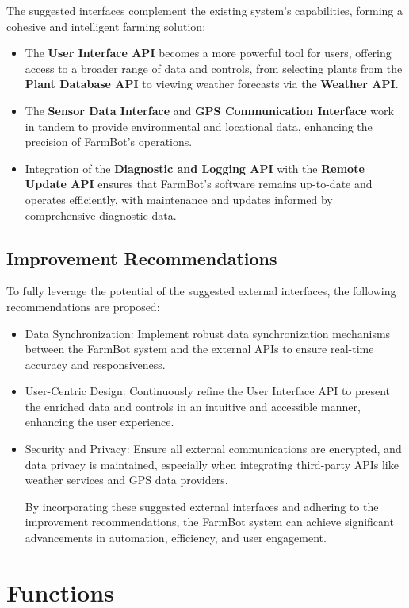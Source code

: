 The suggested interfaces complement the existing system's capabilities, forming a cohesive and intelligent farming solution:
\begin{itemize}
 

   \item  The \textbf{User Interface API} becomes a more powerful tool for users, offering access to a broader range of data and controls, from selecting plants from the \textbf{Plant Database API} to viewing weather forecasts via the \textbf{Weather API}.
   \item The \textbf{Sensor Data Interface} and \textbf{GPS Communication Interface} work in tandem to provide environmental and locational data, enhancing the precision of FarmBot's operations.
   \item  Integration of the \textbf{Diagnostic and Logging API} with the \textbf{Remote Update API} ensures that FarmBot's software remains up-to-date and operates efficiently, with maintenance and updates informed by comprehensive diagnostic data.
\end{itemize}
\subsection{Improvement Recommendations}

To fully leverage the potential of the suggested external interfaces, the following recommendations are proposed:

\begin{itemize}
  

  \item  Data Synchronization: Implement robust data synchronization mechanisms between the FarmBot system and the external APIs to ensure real-time accuracy and responsiveness.
  \item  User-Centric Design: Continuously refine the User Interface API to present the enriched data and controls in an intuitive and accessible manner, enhancing the user experience.
  \item  Security and Privacy: Ensure all external communications are encrypted, and data privacy is maintained, especially when integrating third-party APIs like weather services and GPS data providers.

By incorporating these suggested external interfaces and adhering to the improvement recommendations, the FarmBot system can achieve significant advancements in automation, efficiency, and user engagement.
\end{itemize}
\section{Functions}

